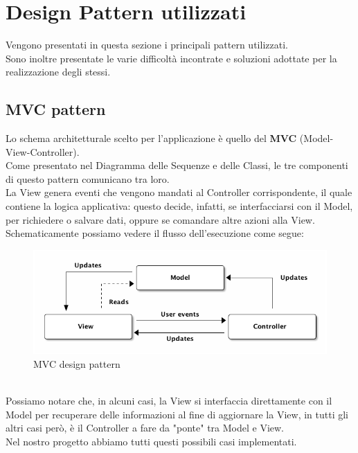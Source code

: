 \documentclass[a4paper,11pt]{report}
\begin{document}
\section{Design Pattern utilizzati}\label{design patter}
Vengono presentati in questa sezione i principali pattern utilizzati.\\
Sono inoltre presentate le varie difficoltà incontrate e soluzioni adottate per la realizzazione degli stessi.\\
\subsection{MVC pattern}
Lo schema architetturale scelto per l’applicazione è quello del \textbf{MVC} (Model-View-Controller).\\
Come presentato nel Diagramma delle Sequenze e delle Classi, le tre componenti di questo pattern comunicano tra loro.\\ 
La View genera eventi che vengono mandati al Controller corrispondente, il quale contiene la logica applicativa: questo decide, infatti, se interfacciarsi con il Model, per richiedere o salvare dati, oppure se comandare altre azioni alla View. \\
Schematicamente possiamo vedere il flusso dell'esecuzione come segue:\\
    \begin{figure}[h!]
    	\centering
    	\includegraphics[width=1\linewidth]{Other/mvc.png}
    	\caption{MVC design pattern}
    \end{figure}\\
Possiamo notare che, in alcuni casi, la View si interfaccia direttamente con il Model per recuperare delle informazioni al fine di aggiornare la View, in tutti gli altri casi però, è il Controller a fare da "ponte" tra Model e View.\\
Nel nostro progetto abbiamo tutti questi possibili casi implementati.\\
\clearpage
\end{document}
